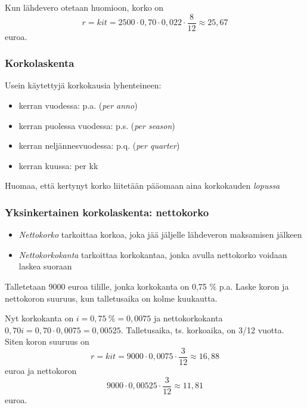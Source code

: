 \documentclass{beamer}
\begin{document}
\begin{frame}
    \pause
    \begin{ratkaisu}
        Kun lähdevero otetaan huomioon, korko on
         \[
            r = kit = 2500\cdot 0,70\cdot 0,022 \cdot \frac{8}{12}\approx 25,67
         \]
         euroa.
    \end{ratkaisu}
\end{frame}

\begin{frame}
    \frametitle{Korkolaskenta}
    \pause Usein käytettyjä korkokausia lyhenteineen:
    \begin{itemize}
        \item kerran vuodessa: p.a. (\emph{per anno}) \pause
        \item kerran puolessa vuodessa: p.s. (\emph{per season}) \pause
        \item kerran neljännesvuodessa: p.q. (\emph{per quarter}) \pause
        \item kerran kuussa: per kk \pause
    \end{itemize}
    Huomaa, että kertynyt korko liitetään pääomaan aina korkokauden \emph{lopussa}
\end{frame}


\begin{frame}
    \frametitle{Yksinkertainen korkolaskenta: nettokorko}
    \pause
    \begin{itemize}
        \item \emph{Nettokorko} tarkoittaa korkoa, joka jää jäljelle lähdeveron maksamisen jälkeen
        \item \emph{Nettokorkokanta} tarkoittaa korkokantaa, jonka avulla nettokorko voidaan laskea suoraan
    \end{itemize}
    \pause
    \begin{esim}
        Talletetaan 9000 euroa tilille, jonka korkokanta on 0,75 \% p.a.
        \pause Laske koron ja nettokoron suuruus, kun talletusaika on kolme kuukautta.
    \end{esim}
    \pause
\end{frame}

\begin{frame}
    \begin{ratkaisu}
        Nyt korkokanta on \pause $i = 0{,}75 \ \%  = 0{,}0075$ ja nettokorkokanta \pause $0{,}70i = 0{,}70 \cdot 0{,}0075 = 0,00525$.
        Talletusaika, ts. korkoaika, on 3/12 vuotta. Siten koron suuruus on
        \[
            r = kit = 9000\cdot 0,0075\cdot \frac{3}{12}\approx 16,88
        \]
        euroa ja nettokoron
        \[
            9000\cdot 0,00525\cdot\frac{3}{12}\approx 11,81
        \]
        euroa.
    \end{ratkaisu}
\end{frame}
\end{document}
